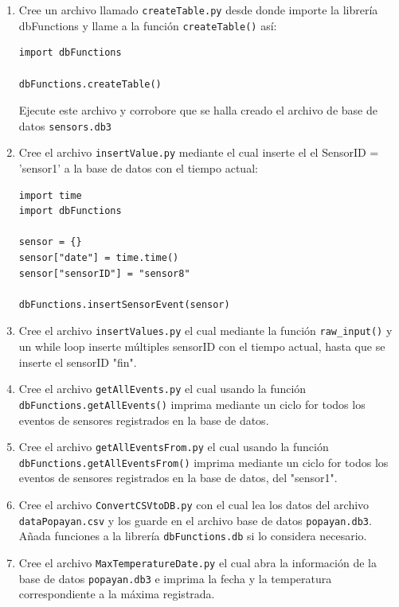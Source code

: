\documentclass[10pt,letterpaper]{article}
\begin{document}
\begin{enumerate}
\item Cree un archivo llamado \verb|createTable.py| desde donde importe la librería dbFunctions y llame a la función \verb|createTable()| así:
\begin{lstlisting}[style=myCustomPythonStyle]
import dbFunctions

dbFunctions.createTable()
\end{lstlisting}
Ejecute este archivo y corrobore que se halla creado el archivo de base de datos \verb|sensors.db3|

\item Cree el archivo \verb|insertValue.py| mediante el cual inserte el el SensorID = 'sensor1' a la base de datos con el tiempo actual:
\begin{lstlisting}[style=myCustomPythonStyle]
import time
import dbFunctions

sensor = {}
sensor["date"] = time.time()
sensor["sensorID"] = "sensor8"

dbFunctions.insertSensorEvent(sensor)
\end{lstlisting}

\item Cree el archivo \verb|insertValues.py| el cual mediante la función \verb|raw_input()| y un while loop inserte múltiples sensorID con el tiempo actual, hasta que se inserte el sensorID "fin".

\item Cree el archivo \verb|getAllEvents.py| el cual usando la función \verb|dbFunctions.getAllEvents()| imprima mediante un ciclo for todos los eventos de sensores registrados en la base de datos.

\item Cree el archivo \verb|getAllEventsFrom.py| el cual usando la función \verb|dbFunctions.getAllEventsFrom()| imprima mediante un ciclo for todos los eventos de sensores registrados en la base de datos, del "sensor1".

\item Cree el archivo \verb|ConvertCSVtoDB.py| con el cual lea los datos del archivo \verb|dataPopayan.csv| y los guarde en el archivo base de datos \verb|popayan.db3|. Añada funciones a la librería \verb|dbFunctions.db| si lo considera necesario. 

\item Cree el archivo \verb|MaxTemperatureDate.py| el cual abra la información de la base de datos \verb|popayan.db3| e imprima la fecha y la temperatura correspondiente a la máxima registrada. 


\end{enumerate}
\end{document}
